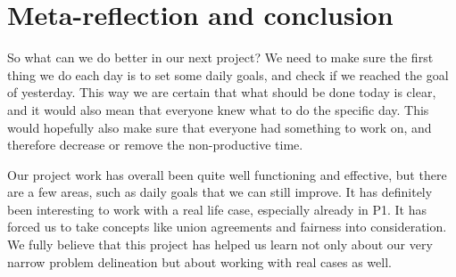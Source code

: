 \section{Meta-reflection and conclusion}
So what can we do better in our next project? We need to make sure the first thing we do each day is to set some daily goals, and check if we reached the goal of yesterday. This way we are certain that what should be done today is clear, and it would also mean that everyone knew what to do the specific day. This would hopefully also make sure that everyone had something to work on, and therefore decrease or remove the non-productive time.

Our project work has overall been quite well functioning and effective, but there are a few areas, such as daily goals that we can still improve. It has definitely been interesting to work with a real life case, especially already in P1. It has forced us to take concepts like union agreements and fairness into consideration. We fully believe that this project has helped us learn not only about our very narrow problem delineation but about working with real cases as well.
